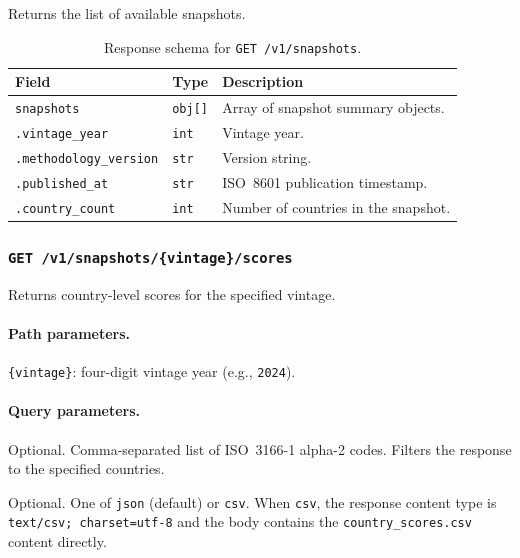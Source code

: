 Returns the list of available snapshots.

\begin{table}[htbp]
  \centering\small
  \caption{Response schema for \texttt{GET /v1/snapshots}.}%
  \label{tab:api-snapshots}
  \begin{tabularx}{\textwidth}{@{}l l X@{}}
    \toprule
    \textbf{Field} & \textbf{Type} & \textbf{Description} \\
    \midrule
    \texttt{snapshots}   & \texttt{obj[]} & Array of snapshot summary objects. \\
    \texttt{.vintage\_year} & \texttt{int} & Vintage year. \\
    \texttt{.methodology\_version} & \texttt{str} & Version string. \\
    \texttt{.published\_at} & \texttt{str} & ISO~8601 publication timestamp. \\
    \texttt{.country\_count} & \texttt{int} & Number of countries in the snapshot. \\
    \bottomrule
  \end{tabularx}
\end{table}

\subsubsection{\texttt{GET /v1/snapshots/\{vintage\}/scores}}

Returns country-level scores for the specified vintage.

\paragraph{Path parameters.}
\texttt{\{vintage\}}: four-digit vintage year (e.g., \texttt{2024}).

\paragraph{Query parameters.}
\begin{description}[style=nextline, leftmargin=5em, labelwidth=4.5em]
  \item[\texttt{country}] Optional.  Comma-separated list of ISO~3166-1
    alpha-2 codes.  Filters the response to the specified countries.
  \item[\texttt{format}]  Optional.  One of \texttt{json} (default) or
    \texttt{csv}.  When \texttt{csv}, the response content type is
    \texttt{text/csv;\,charset=utf-8} and the body contains the
    \texttt{country\_scores.csv} content directly.
\end{description}


